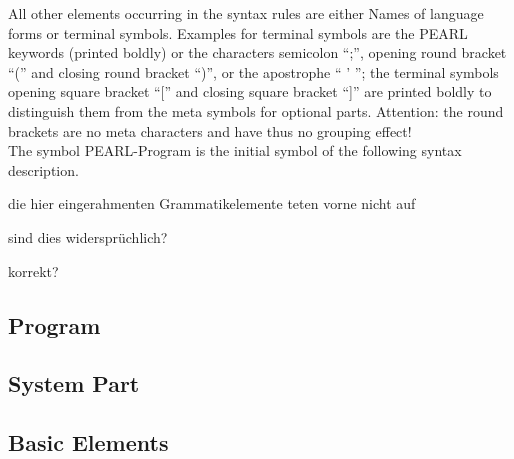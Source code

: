 All other elements occurring in the syntax rules are either Names of language
forms or terminal symbols. Examples for terminal symbols are the PEARL
keywords (printed boldly) or the characters semicolon ``;'', opening round
bracket ``('' and closing round bracket ``)'', 
or the apostrophe `` ' ''; the terminal symbols opening square bracket ``[''
and closing square bracket ``]'' are printed boldly to distinguish them
from the meta symbols for optional parts. Attention: the round brackets are
no meta characters and have thus no grouping effect!\\

The symbol PEARL-Program is the initial symbol of the following syntax
description.
\begin{discuss}
die hier eingerahmenten Grammatikelemente teten vorne nicht auf

sind dies widersprüchlich?

korrekt?
\end{discuss}
\subsection{Program}    %



\subsection{System Part}   %






\subsection{Basic Elements}    %

